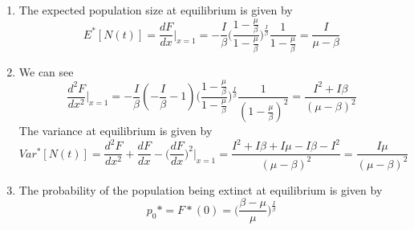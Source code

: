 \documentclass[a4paper,12pt]{article}
\begin{document}
\begin{enumerate}
					
	\item
	The expected population size at equilibrium is given by
	\[  E^*[N(t)] = \frac{dF}{dx}\big|_{x=1}=  - \frac{I}{\beta} \big( \frac{1-\frac{\mu}{\beta}}{1-\frac{\mu}{\beta}}\big)^{\frac{I}{\beta}}\frac{1}{1-\frac{\mu}{\beta}} = \frac{I}{\mu-\beta}  \]
	
	
	\item 
	We can see 
	\[ \frac{d^2F}{dx^2}\big|_{x=1} =  - \frac{I}{\beta}(- \frac{I}{\beta}-1) \big( \frac{1-\frac{\mu}{\beta}}{1-\frac{\mu}{\beta}}\big)^{\frac{I}{\beta}}\frac{1}{(1-\frac{\mu}{\beta})^2} =  \frac{I^2+I\beta}{(\mu-\beta)^2} \]
	The variance at equilibrium is given by
		\[  Var^*[N(t)] = \frac{d^2F}{dx^2} + \frac{dF}{dx} -\big(\frac{dF}{dx}\big)^2\big|_{x=1}=  \frac{I^2+I\beta +I\mu -I\beta -I^2}{(\mu-\beta)^2} =   \frac{I\mu }{(\mu-\beta)^2} \]
		
		\item
		The probability of the population being extinct at equilibrium is given by
			\[ p_0* = F*(0)=  \big( \frac{\beta- \mu}{\mu}\big)^{\frac{I}{\beta}}\]
	\end{enumerate} 
\end{document}
